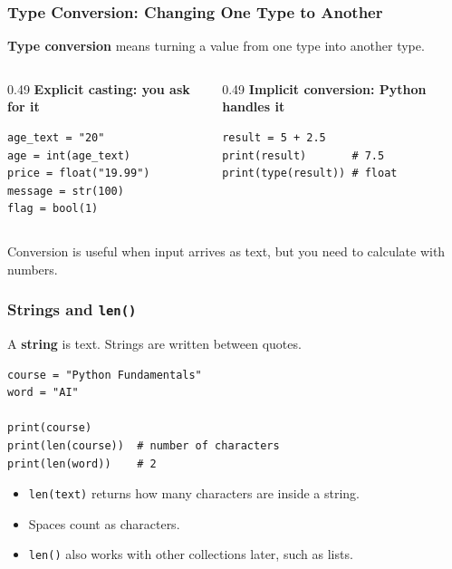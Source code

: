 \documentclass[aspectratio=169,10pt]{beamer}
\newcommand{\keyword}[1]{\textcolor{PrimaryBlue}{\textbf{#1}}}
\newcommand{\myitem}[1]{\item #1\vspace{0.04cm}}
\begin{document}
\begin{frame}[fragile]
\frametitle{Type Conversion: Changing One Type to Another}
\begin{tcolorbox}[lecturebox,title=Key idea]
\keyword{Type conversion} means turning a value from one type into another type.
\end{tcolorbox}

\vspace{0.15cm}
\begin{columns}[T,totalwidth=\textwidth]
\begin{column}{0.49\textwidth}
\textbf{Explicit casting: you ask for it}
\begin{lstlisting}[style=pycode]
age_text = "20"
age = int(age_text)
price = float("19.99")
message = str(100)
flag = bool(1)
\end{lstlisting}
\end{column}
\begin{column}{0.49\textwidth}
\textbf{Implicit conversion: Python handles it}
\begin{lstlisting}[style=pycode]
result = 5 + 2.5
print(result)       # 7.5
print(type(result)) # float
\end{lstlisting}
\end{column}
\end{columns}

\vspace{0.15cm}
\begin{tcolorbox}[lecturebox,title=Checkpoint]
Conversion is useful when input arrives as text, but you need to calculate with numbers.
\end{tcolorbox}
\end{frame}


\begin{frame}[fragile]
\frametitle{Strings and \texttt{len()}}
\begin{tcolorbox}[lecturebox,title=Key idea]
A \keyword{string} is text. Strings are written between quotes.
\end{tcolorbox}

\vspace{0.2cm}
\begin{lstlisting}[style=pycode]
course = "Python Fundamentals"
word = "AI"

print(course)
print(len(course))  # number of characters
print(len(word))    # 2
\end{lstlisting}

\vspace{0.15cm}
\begin{itemize}
  \myitem{\texttt{len(text)} returns how many characters are inside a string.}
  \myitem{Spaces count as characters.}
  \myitem{\texttt{len()} also works with other collections later, such as lists.}
\end{itemize}
\end{frame}
\end{document}
